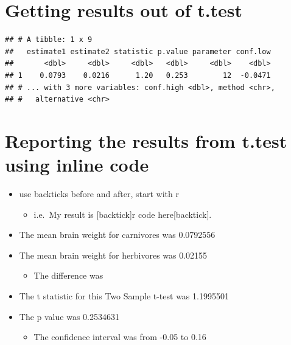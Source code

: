\documentclass[
]{book}
\newenvironment{Shaded}{\begin{snugshade}}{\end{snugshade}}
\newcommand{\DataTypeTok}[1]{\textcolor[rgb]{0.13,0.29,0.53}{#1}}
\newcommand{\KeywordTok}[1]{\textcolor[rgb]{0.13,0.29,0.53}{\textbf{#1}}}
\newcommand{\NormalTok}[1]{#1}
\newcommand{\OperatorTok}[1]{\textcolor[rgb]{0.81,0.36,0.00}{\textbf{#1}}}
\newcommand{\StringTok}[1]{\textcolor[rgb]{0.31,0.60,0.02}{#1}}
\providecommand{\tightlist}{%
  \setlength{\itemsep}{0pt}\setlength{\parskip}{0pt}}
\begin{document}
\begin{Shaded}
\end{Shaded}

\hypertarget{getting-results-out-of-t.test-1}{%
\section{Getting results out of t.test}\label{getting-results-out-of-t.test-1}}

\begin{verbatim}
## # A tibble: 1 x 9
##   estimate1 estimate2 statistic p.value parameter conf.low
##       <dbl>     <dbl>     <dbl>   <dbl>     <dbl>    <dbl>
## 1    0.0793    0.0216      1.20   0.253        12  -0.0471
## # ... with 3 more variables: conf.high <dbl>, method <chr>,
## #   alternative <chr>
\end{verbatim}

\hypertarget{reporting-the-results-from-t.test-using-inline-code}{%
\section{Reporting the results from t.test using inline code}\label{reporting-the-results-from-t.test-using-inline-code}}

\begin{itemize}
\tightlist
\item
  use backticks before and after, start with r

  \begin{itemize}
  \tightlist
  \item
    i.e.~My result is {[}backtick{]}r code here{[}backtick{]}.
  \end{itemize}
\item
  The mean brain weight for carnivores was 0.0792556
\item
  The mean brain weight for herbivores was 0.02155

  \begin{itemize}
  \tightlist
  \item
    The difference was
  \end{itemize}
\item
  The t statistic for this Two Sample t-test was 1.1995501
\item
  The p value was 0.2534631

  \begin{itemize}
  \tightlist
  \item
    The confidence interval was from -0.05 to 0.16
  \end{itemize}
\end{itemize}
\end{document}
